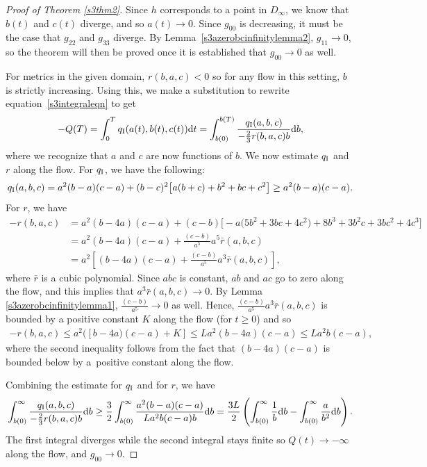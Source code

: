 \documentclass[10pt,a4paper]{amsart}
\numberwithin{equation}{section}
\begin{document}
\begin{proof}[Proof of Theorem \ref{s3thm2}]
Since $h$ corresponds to a point in $D_{\infty}$, we know that $b(t)$ and $c(t)$ diverge, and so $a(t) \rightarrow 0$. Since $g_{00}$ is decreasing, it must be the case that $g_{22}$ and $g_{33}$ diverge. By Lemma~\ref{s3azerobcinfinitylemma2}, $g_{11} \rightarrow 0$, so the theorem will then be proved once it is established that $g_{00} \rightarrow 0$ as well.

For metrics in the given domain, $r(b, a, c) < 0$ so for any flow in this setting, $b$ is strictly increasing. Using this, we make a substitution to rewrite equation~\eqref{s3integraleqn} to get
\[
-Q(T) = \int_0^T q_{\rm I}(a(t), b(t), c(t)) {\rm d}t = \int_{b(0)}^{b(T)} \frac{q_{\rm I}(a, b, c)}{-\frac{2}{3} r(b, a, c) b} {\rm d} b,
\]
where we recognize that $a$ and $c$ are now functions of $b$. We now estimate $q_{\rm I}$ and $r$ along the flow. For $q_{\rm I}$, we have the following:
\begin{gather*}
q_{\rm I}(a, b, c) = a^2(b - a)(c - a) + (b - c)^2\big[a(b + c) + b^2 + bc + c^2\big]
		 \geq a^2(b - a)(c - a).
\end{gather*}
For $r$, we have
\begin{align*}
-r(b, a, c) &= a^2(b - 4a)(c - a)
		+ (c - b)\big[{-}a\big(5b^2 + 3bc + 4c^2\big) + 8b^3 + 3b^2 c + 3b c^2 + 4c^3\big] \\
		&= a^2(b - 4a)(c - a) + \frac{(c - b)}{a^5} a^5 \bar{r}(a, b, c) \\
		&= a^2\left[(b - 4a)(c - a) + \frac{(c - b)}{a^5} a^3 \bar{r}(a, b, c)\right],
\end{align*}
where $\bar{r}$ is a cubic polynomial. Since $abc$ is constant, $ab$ and $ac$ go to zero along the flow, and this implies that $a^3 \bar{r}(a, b, c) \rightarrow 0$. By Lemma \ref{s3azerobcinfinitylemma1}, $\frac{(c - b)}{a^5} \rightarrow 0$ as well. Hence, $\frac{(c - b)}{a^5} a^3 \bar{r}(a, b, c)$ is bounded by a positive constant $K$ along the flow (for $t \geq 0$) and so
\begin{gather*}
-r(b, a, c) \leq a^2([b - 4a)(c - a) + K]
		\leq L a^2(b - 4a)(c - a)
		\leq L a^2 b (c - a),
\end{gather*}
where the second inequality follows from the fact that $(b - 4a)(c - a)$ is bounded below by a~positive constant along the flow.

Combining the estimate for $q_{\rm I}$ and for $r$, we have
\begin{gather*}
\int_{b(0)}^{\infty} \frac{q_{\rm I}(a, b, c)}{-\frac{2}{3} r(b, a, c) b} {\rm d} b
		 \geq \frac{3}{2} \int_{b(0)}^{\infty} \frac{a^2(b - a)(c - a)}{L a^2 b (c - a) b} {\rm d} b
		 = \frac{3L}{2} \left( \int_{b(0)}^{\infty} \frac{1}{b} {\rm d} b - \int_{b(0)}^{\infty} \frac{a}{b^2} {\rm d} b \right).
\end{gather*}
The first integral diverges while the second integral stays finite so $Q(t) \rightarrow -\infty$ along the flow, and $g_{00} \rightarrow 0$.
\end{proof}
\end{document}
